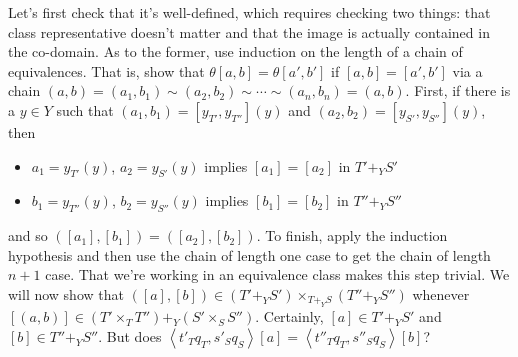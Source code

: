 \documentclass[12pt]{article}
\renewcommand{\(}{\left(}
\renewcommand{\)}{\right)}
\renewcommand{\{}{\left\lbrace}
\renewcommand{\}}{\right\rbrace}
\theoremstyle{remark}
\theoremstyle{definition}
\begin{document}
Let's first check that it's well-defined, which requires checking two things: that class representative doesn't matter and that the image is actually contained in the co-domain. As to the former, use induction on the length of a chain of equivalences.  That is, show that $\theta [a,b] = \theta [a',b']$ if $[a,b] = [a',b']$ via a chain $(a,b) = (a_1,b_1) \sim (a_2,b_2) \sim \dotsm \sim (a_n,b_n) = (a,b)$. First, if there is a $y \in Y$ such that $(a_1,b_1) = [y_{T'},y_{T''}](y)$ and $(a_2,b_2)=[y_{S'},y_{S''}](y)$, then 
\begin{itemize}
	\item $a_1 = y_{T'}(y)$,  $a_2 = y_{S'}(y)$ implies $[a_1]=[a_2]$ in $T' +_Y S'$ 
	\item $b_1 = y_{T''}(y)$, $b_2 = y_{S''}(y)$ implies $[b_1]=[b_2]$ in $T'' +_Y S''$
\end{itemize}
and so $([a_1],[b_1])=([a_2],[b_2])$. To finish, apply the induction hypothesis and then use the chain of length one case to get the chain of length $n+1$ case. That we're working in an equivalence class makes this step trivial.  We will now show that $([a],[b]) \in (T' +_Y S') \times_{T +_Y S} (T'' +_Y S'')$ whenever $[(a,b)] \in (T' \times_T T'') +_Y (S' \times_S S'')$.  Certainly, $[a] \in T' +_Y S'$ and $[b] \in T'' +_Y S''$.   But does $\left\langle t'_{T}q_T,s'_{S}q_S \right\rangle [a]= \left\langle t''_{T}q_T,s''_{S}q_S \right\rangle [b]$?  










\end{document}
